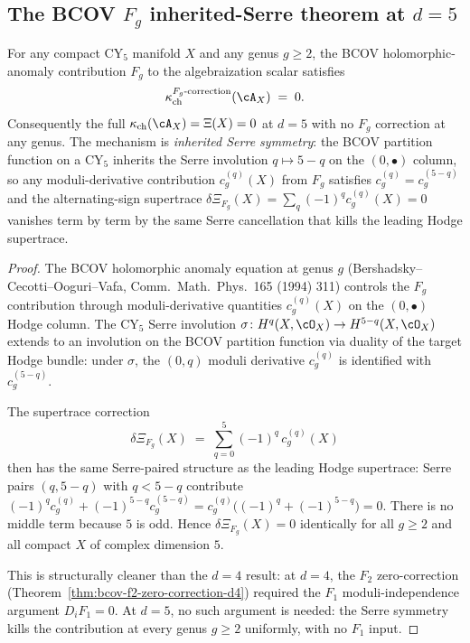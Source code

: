 \subsection{The BCOV \texorpdfstring{$F_g$}{F-g} inherited-Serre theorem at \texorpdfstring{$d = 5$}{d = 5}}
\label{subsec:cy-strat-d5-bcov-fg}

\begin{theorem}[BCOV \texorpdfstring{$F_g$}{F-g} contributes zero to \texorpdfstring{$\kappa_{\mathrm{ch}}$}{kappa-ch} at \texorpdfstring{$d = 5$}{d = 5} for all \texorpdfstring{$g \geq 2$}{g >= 2}]
\label{thm:bcov-fg-zero-correction-d5}
For any compact CY$_5$ manifold $X$ and any genus $g \geq 2$, the BCOV
holomorphic-anomaly contribution $F_g$ to the algebraization scalar
satisfies
\[
 \kappa_{\mathrm{ch}}^{F_g\text{-correction}}(\cA_X) \;=\; 0.
\]
Consequently the full $\kappa_{\mathrm{ch}}(\cA_X) = \Xi(X) = 0$ at
$d = 5$ with no $F_g$ correction at any genus. The mechanism is
\emph{inherited Serre symmetry}: the BCOV partition function on a
CY$_5$ inherits the Serre involution $q \mapsto 5 - q$ on the
$(0, \bullet)$ column, so any moduli-derivative contribution
$c_g^{(q)}(X)$ from $F_g$ satisfies $c_g^{(q)} = c_g^{(5-q)}$ and the
alternating-sign supertrace
$\delta\Xi_{F_g}(X) = \sum_q (-1)^q c_g^{(q)}(X) = 0$ vanishes term by
term by the same Serre cancellation that kills the leading Hodge
supertrace.
\end{theorem}

\begin{proof}
The BCOV holomorphic anomaly equation at genus $g$
(Bershadsky--Cecotti--Ooguri--Vafa, Comm.~Math.~Phys.~165 (1994) 311)
controls the $F_g$ contribution through moduli-derivative quantities
$c_g^{(q)}(X)$ on the $(0, \bullet)$ Hodge column. The CY$_5$ Serre
involution $\sigma\colon H^q(X, \cO_X) \to H^{5-q}(X, \cO_X)$ extends
to an involution on the BCOV partition function via duality of the
target Hodge bundle: under $\sigma$, the $(0, q)$ moduli derivative
$c_g^{(q)}$ is identified with $c_g^{(5-q)}$.

The supertrace correction
\[
 \delta\Xi_{F_g}(X) \;=\; \sum_{q = 0}^{5} (-1)^q\, c_g^{(q)}(X)
\]
then has the same Serre-paired structure as the leading Hodge
supertrace: Serre pairs $(q, 5-q)$ with $q < 5 - q$ contribute
$(-1)^q c_g^{(q)} + (-1)^{5-q} c_g^{(5-q)} = c_g^{(q)} \bigl((-1)^q +
(-1)^{5-q}\bigr) = 0$. There is no middle term because $5$ is odd.
Hence $\delta\Xi_{F_g}(X) = 0$ identically for all $g \geq 2$ and all
compact $X$ of complex dimension $5$.

This is structurally cleaner than the $d = 4$ result: at $d = 4$, the
$F_2$ zero-correction (Theorem~\ref{thm:bcov-f2-zero-correction-d4})
required the $F_1$ moduli-independence argument $D_i F_1 = 0$. At
$d = 5$, no such argument is needed: the Serre symmetry kills the
contribution at every genus $g \geq 2$ uniformly, with no $F_1$ input.
\end{proof}

